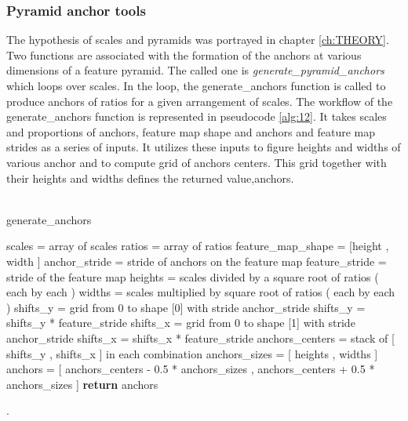 \subsubsection{Pyramid anchor tools}
The hypothesis of scales and pyramids was portrayed in chapter \ref{ch:THEORY}. Two functions  are associated with the formation of the anchors at various dimensions of a feature pyramid. The called one is \textit{generate\_pyramid\_anchors} which loops over scales. In the loop, the generate\_anchors function is called to produce anchors of ratios for a given arrangement of scales. The workflow of the generate\_anchors function is represented in pseudocode \ref{alg:12}. It takes scales and proportions of anchors, feature map shape and anchors and feature map strides as a series of inputs. It utilizes these inputs to figure heights and widths of various anchor and to compute grid of anchors centers. This grid together with their heights and widths defines the returned value,anchors.
\\
\\
\begin{algorithm}[H] \label{alg:12}
  \caption{generate\_anchors}
  \SetAlgoLined
  \DontPrintSemicolon
  scales = array of scales\;
ratios = array of ratios\;
feature\_map\_shape = [height , width ]\;
anchor\_stride = stride of anchors on the feature map\;
feature\_stride = stride of the feature map\;
 heights = scales divided by a square root of ratios ( each by each )\;
 widths = scales multiplied by square root of ratios ( each by each )\;
 shifts\_y = grid from 0 to shape [0] with stride anchor\_stride\;
 shifts\_y = shifts\_y * feature\_stride\;
 shifts\_x = grid from 0 to shape [1] with stride anchor\_stride\;
 shifts\_x = shifts\_x * feature\_stride\;
 anchors\_centers = stack of [ shifts\_y , shifts\_x ] in each combination\;
anchors\_sizes = [ heights , widths ]\;
anchors = [ anchors\_centers - 0.5 * anchors\_sizes , anchors\_centers + 0.5 * anchors\_sizes ]\;
\textbf{return} anchors
\end{algorithm}
.\\
\\
